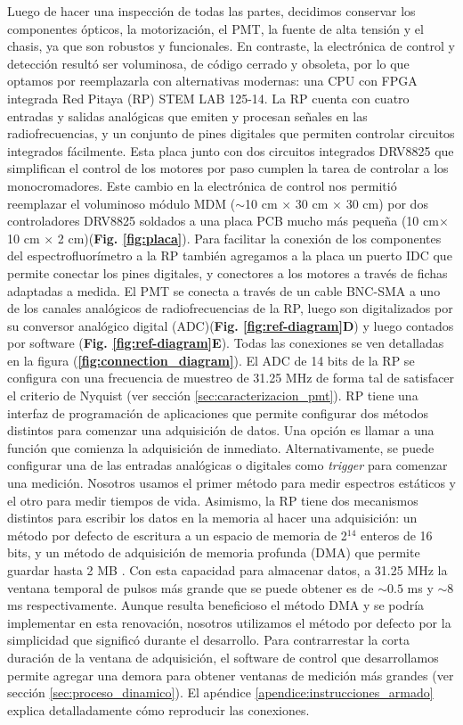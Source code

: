 Luego de hacer una inspección de todas las partes, decidimos conservar los componentes ópticos, la motorización, el PMT, la fuente de alta tensión y el chasis, ya que son robustos y funcionales.  
En contraste, la electrónica de control y detección resultó ser voluminosa, de código cerrado y obsoleta, por lo que optamos por reemplazarla con alternativas modernas: una CPU con FPGA integrada Red Pitaya (RP) STEM LAB 125-14.
La RP cuenta con cuatro entradas y salidas analógicas que emiten y procesan señales en las radiofrecuencias, y un conjunto de pines digitales que permiten controlar circuitos integrados fácilmente.
Esta placa junto con dos circuitos integrados DRV8825 que simplifican el control de los motores por paso cumplen la tarea de controlar a los monocromadores.
Este cambio en la electrónica de control nos permitió reemplazar el voluminoso módulo MDM ($\sim$10 cm $\times$ 30 cm $\times$ 30 cm) por dos controladores DRV8825 soldados a una placa PCB mucho más pequeña (10 cm$\times$ 10 cm $\times$ 2 cm)(\textbf{Fig. \ref{fig:placa}}).
Para facilitar la conexión de los componentes del espectrofluorímetro a la RP también agregamos a la placa un puerto IDC que permite conectar los pines digitales, y conectores a los motores a través de fichas adaptadas a medida.
El PMT se conecta a través de un cable BNC-SMA a uno de los canales analógicos de radiofrecuencias de la RP, luego son digitalizados por su conversor analógico digital (ADC)(\textbf{Fig. \ref{fig:ref-diagram}D}) y luego contados por software (\textbf{Fig. \ref{fig:ref-diagram}E}).
Todas las conexiones se ven detalladas en la figura (\textbf{\ref{fig:connection_diagram}}).
El ADC de 14 bits de la RP se configura con una frecuencia de muestreo de 31.25 MHz de forma tal de satisfacer el criterio de Nyquist (ver sección \ref{sec:caracterizacion_pmt}).
RP tiene una interfaz de programación de aplicaciones que permite configurar dos métodos distintos para comenzar una adquisición de datos.
Una opción es llamar a una función que comienza la adquisición de inmediato.
Alternativamente, se puede configurar una de las entradas analógicas o digitales como \textit{trigger} para comenzar una medición.
Nosotros usamos el primer método para medir espectros estáticos y el otro para medir tiempos de vida.
Asimismo, la RP tiene dos mecanismos distintos para escribir los datos en la memoria al hacer una adquisición: un método por defecto de escritura a un espacio de memoria de 2$^{14}$ enteros de 16 bits, y un método de adquisición de memoria profunda (DMA) que permite guardar hasta 2 MB \cite{DMA_rp}.
Con esta capacidad para almacenar datos, a 31.25 MHz la ventana temporal de pulsos más grande que se puede obtener es de $\sim 0.5$ ms y $\sim 8$ ms respectivamente.
Aunque resulta beneficioso el método DMA y se podría implementar en esta renovación, nosotros utilizamos el método por defecto por la simplicidad que significó durante el desarrollo.
Para contrarrestar la corta duración de la ventana de adquisición, el software de control que desarrollamos permite agregar una demora para obtener ventanas de medición más grandes (ver sección \ref{sec:proceso_dinamico}).
El apéndice \ref{apendice:instrucciones_armado} explica detalladamente cómo reproducir las conexiones.

